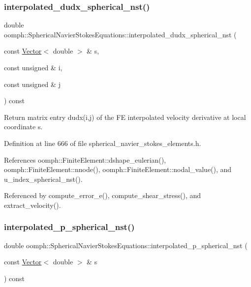 \subsubsection{\texorpdfstring{interpolated\+\_\+dudx\+\_\+spherical\+\_\+nst()}{interpolated\_dudx\_spherical\_nst()}}
{\footnotesize\ttfamily double oomph\+::\+Spherical\+Navier\+Stokes\+Equations\+::interpolated\+\_\+dudx\+\_\+spherical\+\_\+nst (\begin{DoxyParamCaption}\item[{const \hyperlink{classoomph_1_1Vector}{Vector}$<$ double $>$ \&}]{s,  }\item[{const unsigned \&}]{i,  }\item[{const unsigned \&}]{j }\end{DoxyParamCaption}) const\hspace{0.3cm}{\ttfamily [inline]}}



Return matrix entry dudx(i,j) of the FE interpolated velocity derivative at local coordinate s. 



Definition at line 666 of file spherical\+\_\+navier\+\_\+stokes\+\_\+elements.\+h.



References oomph\+::\+Finite\+Element\+::dshape\+\_\+eulerian(), oomph\+::\+Finite\+Element\+::nnode(), oomph\+::\+Finite\+Element\+::nodal\+\_\+value(), and u\+\_\+index\+\_\+spherical\+\_\+nst().



Referenced by compute\+\_\+error\+\_\+e(), compute\+\_\+shear\+\_\+stress(), and extract\+\_\+velocity().

\mbox{\label{classoomph_1_1SphericalNavierStokesEquations_a93c638dbbf7fdcb0202514766e71bc73}} 
\subsubsection{\texorpdfstring{interpolated\+\_\+p\+\_\+spherical\+\_\+nst()}{interpolated\_p\_spherical\_nst()}}
{\footnotesize\ttfamily double oomph\+::\+Spherical\+Navier\+Stokes\+Equations\+::interpolated\+\_\+p\+\_\+spherical\+\_\+nst (\begin{DoxyParamCaption}\item[{const \hyperlink{classoomph_1_1Vector}{Vector}$<$ double $>$ \&}]{s }\end{DoxyParamCaption}) const\hspace{0.3cm}{\ttfamily [inline]}}



